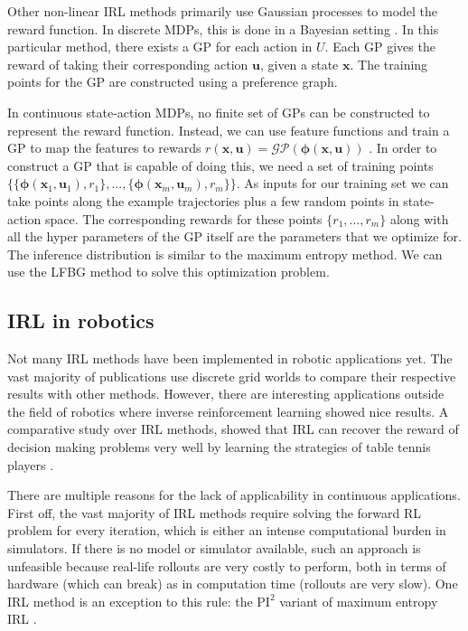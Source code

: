 \documentclass[mscThesis.tex]{subfiles}
\begin{document}
Other non-linear IRL methods primarily use Gaussian processes to model the reward function. In discrete MDPs, this is done in a Bayesian setting \cite{qiao2011inverse}. In this particular method, there exists a GP for each action in $U$. Each GP gives the reward of taking their corresponding action $\bm{u}$, given a state $\bm{x}$. The training points for the GP are constructed using a preference graph.

In continuous state-action MDPs, no finite set of GPs can be constructed to represent the reward function. Instead, we can use feature functions and train a GP to map the features to rewards $r(\bm{x}, \bm{u}) = \mathcal{GP}(\bm{\phi}(\bm{x}, \bm{u}))$ \cite{Levine2011}. In order to construct a GP that is capable of doing this, we need a set of training points $\{\{\bm{\phi}(\bm{x}_1, \bm{u}_1), r_1\},...,\{\bm{\phi}(\bm{x}_m, \bm{u}_m), r_m\}\}$. As inputs for our training set we can take points along the example trajectories plus a few random points in state-action space. The corresponding rewards for these points $\{r_1,...,r_m\}$ along with all the hyper parameters of the GP itself are the parameters that we optimize for. The inference distribution is similar to the maximum entropy method. We can use the LFBG method to solve this optimization problem.  

\subsection{IRL in robotics}
Not many IRL methods have been implemented in robotic applications yet. The vast majority of publications use discrete grid worlds to compare their respective results with other methods. However, there are interesting applications outside the field of robotics where inverse reinforcement learning showed nice results. A comparative study over IRL methods, showed that IRL can recover the reward of decision making problems very well by learning the strategies of table tennis players \cite{muelling2014learning}.

There are multiple reasons for the lack of applicability in continuous applications. First off, the vast majority of IRL methods require solving the forward RL problem for every iteration, which is either an intense computational burden in simulators. If there is no model or simulator available, such an approach is unfeasible because real-life rollouts are very costly to perform, both in terms of hardware (which can break) as in computation time (rollouts are very slow). One IRL method is an exception to this rule: the $\text{PI}^2$ variant of maximum entropy IRL \cite{Kalakrishnan2013}. 
\end{document}
